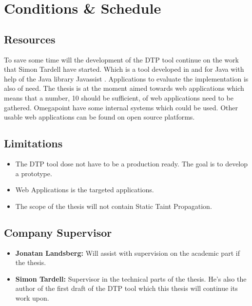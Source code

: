 \documentclass{../kththesis}
\begin{document}
\chapter{Conditions \& Schedule}
\section{Resources}
To save some time will the development of the DTP tool continue on the work that Simon Tardell have started. Which is a tool developed in and for Java with help of the Java library Javassist \parencite{javassist}. Applications to evaluate the implementation is also of need. The thesis is at the moment aimed towards web applications which means that a number, 10 should be sufficient, of web applications need to be gathered. Omegapoint have some internal systems which could be used. Other usable web applications can be found on open source platforms.


\section{Limitations}
\begin{itemize}  
	\item The DTP tool dose not have to be a production ready. The goal is to develop a prototype.
	\item Web Applications is the targeted applications.
	\item The scope of the thesis will not contain Static Taint Propagation.
\end{itemize}


\section{Company Supervisor}
\begin{itemize}
	\item \textbf{Jonatan Landsberg:} Will assist with supervision on the academic part if the thesis.
	\item \textbf{Simon Tardell:} Supervisor in the technical parts of the thesis. He's also the author of the first draft of the DTP tool which this thesis will continue its work upon. 
\end{itemize}
\end{document}
